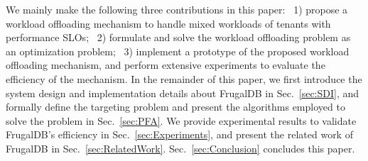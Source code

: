 We mainly make the following three contributions in this paper: ~1) propose a workload offloading mechanism to handle mixed workloads of tenants with performance SLOs; ~2) formulate and solve the workload offloading problem as an optimization problem; ~3) implement a prototype of the proposed workload offloading mechanism, and perform extensive experiments to evaluate the efficiency of the mechanism. In the remainder of this paper, we first introduce the system design and implementation details about FrugalDB in Sec.~\ref{sec:SDI}, and formally define the targeting problem and present the algorithms employed to solve the problem in Sec.~\ref{sec:PFA}. We provide experimental results to validate FrugalDB's efficiency in Sec.~\ref{sec:Experiments}, and present the related work of FrugalDB in Sec.~\ref{sec:RelatedWork}. Sec.~\ref{sec:Conclusion} concludes this paper. 